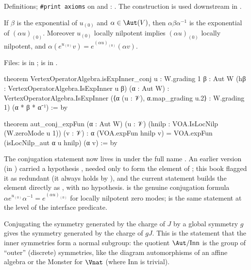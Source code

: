 \begin{status}
Definitions; \texttt{\#print axioms} on  and :
. The construction  is used downstream in
.
\end{status}

\begin{theorem}\label{l04:thm:conj}
If $\beta$ is the exponential of $u_{(0)}$ and $\alpha\in\Aut(\lfourV)$, then $\alpha\beta\alpha^{-1}$
is the exponential of $(\alpha u)_{(0)}$. Moreover $u_{(0)}$ locally nilpotent implies
$(\alpha u)_{(0)}$ locally nilpotent, and $\alpha(e^{u_{(0)}}v) = e^{(\alpha u)_{(0)}}(\alpha v)$.
\end{theorem}
\noindent Files:  is in ;
 is in .
\begin{leancode}
theorem VertexOperatorAlgebra.isExpInner_conj {u : W.grading 1} {β : Aut W}
    (hβ : VertexOperatorAlgebra.IsExpInner u β) (α : Aut W) :
    VertexOperatorAlgebra.IsExpInner (⟨α (u : 𝒱), α.map_grading u.2⟩ : W.grading 1)
      (α * β * α⁻¹) := by

theorem aut_conj_expFun (α : Aut W) (u : 𝒱)
    (hnilp : VOA.IsLocNilp (W.zeroMode u 1)) (v : 𝒱) :
    α (VOA.expFun hnilp v) = VOA.expFun (isLocNilp_aut α u hnilp) (α v) := by
\end{leancode}
\begin{dictionary}
The conjugation statement now lives in  under the full name
. An earlier version (in ) carried a hypothesis
, needed only to form the element of ; this book flagged it as redundant
(it always holds by ), and the current statement builds the element directly as
, with no hypothesis.  is the genuine conjugation formula
$\alpha e^{u_{(0)}}\alpha^{-1} = e^{(\alpha u)_{(0)}}$ for locally nilpotent zero modes;
 is the same statement at the level of the interface predicate.
\end{dictionary}
\begin{physics}
Conjugating the symmetry generated by the charge of $J$ by a global symmetry $g$ gives the symmetry
generated by the charge of $gJ$. This is the statement that the inner symmetries form a normal
subgroup: the quotient $\Aut/\mathrm{Inn}$ is the group of ``outer'' (discrete) symmetries, like the
diagram automorphisms of an affine algebra or the Monster for $\Vnat$ (where $\mathrm{Inn}$ is trivial).
\end{physics}
